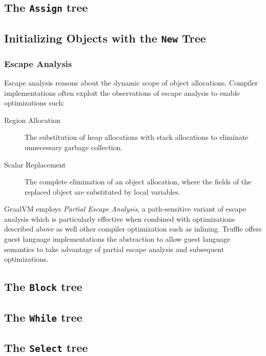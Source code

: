 \subsection{The \texttt{Assign} tree}

\subsection{Initializing Objects with the \texttt{New} Tree}

\subsubsection{Escape Analysis}

Escape analysis\cite{escape-analysis} reasons about the dynamic scope of object allocations. 
Compiler implementations often exploit the observations of escape analysis to enable optimizations such:

\begin{description}
	\item[Region Allocation\cite{java:escape-analysis}\cite{tofte:region-memory}] The substitution of heap allocations with stack allocations to eliminate unnecessary garbage collection.
	\item[Scalar Replacement\cite{java:escape-analysis-optimizations}] The complete elimination of an object allocation, where the fields of the replaced object are substituted by local variables.
\end{description}

GraalVM employs \textit{Partial Escape Analysis}\cite{java:partial-escape-analysis}, a path-sensitive variant of escape analysis which is particularly effective when combined with optimizations described above as well other compiler optimization such as inlining. 
Truffle offers guest language implementations the  abstraction to allow guest language semantics to take advantage of partial escape analysis and subsequent optimizations.

\subsection{The \texttt{Block} tree}

\subsection{The \texttt{While} tree}

\subsection{The \texttt{Select} tree}


